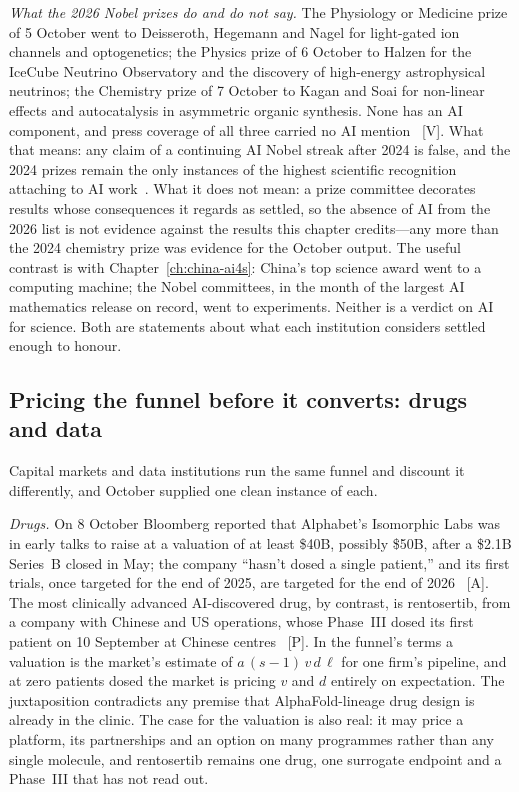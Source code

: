\emph{What the 2026 Nobel prizes do and do not say.} The Physiology or Medicine prize of 5 October went to Deisseroth, Hegemann and Nagel for light-gated ion channels and optogenetics; the Physics prize of 6 October to Halzen for the IceCube Neutrino Observatory and the discovery of high-energy astrophysical neutrinos; the Chemistry prize of 7 October to Kagan and Soai for non-linear effects and autocatalysis in asymmetric organic synthesis. None has an AI component, and press coverage of all three carried no AI mention~\cite{sci-nobel-2026} [V]. What that means: any claim of a continuing AI Nobel streak after 2024 is false, and the 2024 prizes remain the only instances of the highest scientific recognition attaching to AI work~\cite{nobel-2024}. What it does not mean: a prize committee decorates results whose consequences it regards as settled, so the absence of AI from the 2026 list is not evidence against the results this chapter credits---any more than the 2024 chemistry prize was evidence for the October output. The useful contrast is with Chapter~\ref{ch:china-ai4s}: China's top science award went to a computing machine; the Nobel committees, in the month of the largest AI mathematics release on record, went to experiments. Neither is a verdict on AI for science. Both are statements about what each institution considers settled enough to honour.

\subsection{Pricing the funnel before it converts: drugs and data}
\label{sec:sci-pricing-funnel}

Capital markets and data institutions run the same funnel and discount it differently, and October supplied one clean instance of each.

\emph{Drugs.} On 8 October Bloomberg reported that Alphabet's Isomorphic Labs was in early talks to raise at a valuation of at least \$40B, possibly \$50B, after a \$2.1B Series~B closed in May; the company ``hasn't dosed a single patient,'' and its first trials, once targeted for the end of 2025, are targeted for the end of 2026~\cite{sci-isomorphic} [A]. The most clinically advanced AI-discovered drug, by contrast, is rentosertib, from a company with Chinese and US operations, whose Phase~III dosed its first patient on 10 September at Chinese centres~\cite{sci-insilico-dosing} [P]. In the funnel's terms a valuation is the market's estimate of $a\,(s-1)\,v\,d\,\ell$ for one firm's pipeline, and at zero patients dosed the market is pricing $v$ and $d$ entirely on expectation. The juxtaposition contradicts any premise that AlphaFold-lineage drug design is already in the clinic. The case for the valuation is also real: it may price a platform, its partnerships and an option on many programmes rather than any single molecule, and rentosertib remains one drug, one surrogate endpoint and a Phase~III that has not read out.

